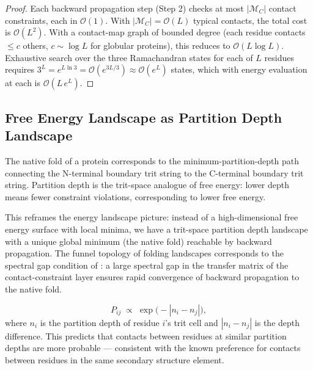 \begin{proof}
Each backward propagation step (Step 2) checks at most
$|\mathcal{M}_C|$ contact constraints, each in $\mathcal{O}(1)$.  With
$|\mathcal{M}_C| = \mathcal{O}(L)$ typical contacts, the total cost is
$\mathcal{O}(L^2)$.  With a contact-map graph of bounded degree (each
residue contacts $\leq c$ others, $c \sim \log L$ for globular proteins),
this reduces to $\mathcal{O}(L \log L)$.  Exhaustive search over the three
Ramachandran states for each of $L$ residues requires $3^L =
e^{L \ln 3} = \mathcal{O}(e^{3L/3}) \approx \mathcal{O}(e^{L})$ states,
which with energy evaluation at each is $\mathcal{O}(L\, e^L)$.
\end{proof}

\subsection{Free Energy Landscape as Partition Depth Landscape}

\begin{proposition}
\label{prop:ch05-min-depth}
The native fold of a protein corresponds to the minimum-partition-depth
path connecting the N-terminal boundary trit string to the C-terminal
boundary trit string.  Partition depth is the trit-space analogue of
free energy: lower depth means fewer constraint violations, corresponding
to lower free energy.
\end{proposition}

This reframes the energy landscape picture: instead of a high-dimensional
free energy surface with local minima, we have a trit-space partition depth
landscape with a unique global minimum (the native fold) reachable by
backward propagation.  The funnel topology of folding landscapes corresponds
to the spectral gap condition of : a large spectral
gap in the transfer matrix of the contact-constraint layer ensures rapid
convergence of backward propagation to the native fold.

\begin{equation}
\label{eq:ch05-contact-probability}
    P_{ij} \;\propto\; \exp\!\bigl(-|n_i - n_j|\bigr),
\end{equation}
where $n_i$ is the partition depth of residue $i$'s trit cell and $|n_i -
n_j|$ is the depth difference.  This predicts that contacts between
residues at similar partition depths are more probable --- consistent with
the known preference for contacts between residues in the same secondary
structure element.

